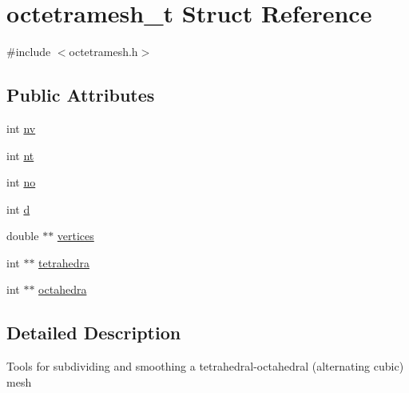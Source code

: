 \hypertarget{structoctetramesh__t}{
\section{octetramesh\_\-t Struct Reference}
\label{structoctetramesh__t}
}


{\ttfamily \#include $<$octetramesh.h$>$}

\subsection*{Public Attributes}
\begin{DoxyCompactItemize}
\item 
int \hyperlink{structoctetramesh__t_aa25cbd4f9e849a1c2535d94c8ea901b0}{nv}
\item 
int \hyperlink{structoctetramesh__t_af6d553cee2b98ceae1277c7f5580094f}{nt}
\item 
int \hyperlink{structoctetramesh__t_a1f5c59c2b77adf6a65e3674e19753aef}{no}
\item 
int \hyperlink{structoctetramesh__t_ade06d552058fff629cb2d30526596ffe}{d}
\item 
double $\ast$$\ast$ \hyperlink{structoctetramesh__t_a35375ef64e394e82df7e3ae1a29c357d}{vertices}
\item 
int $\ast$$\ast$ \hyperlink{structoctetramesh__t_a86a9824e26a23c4503f00f613a41668f}{tetrahedra}
\item 
int $\ast$$\ast$ \hyperlink{structoctetramesh__t_a91308dcaf1e928418dbf84ae3b673044}{octahedra}
\end{DoxyCompactItemize}


\subsection{Detailed Description}
Tools for subdividing and smoothing a tetrahedral-\/octahedral (alternating cubic) mesh 


